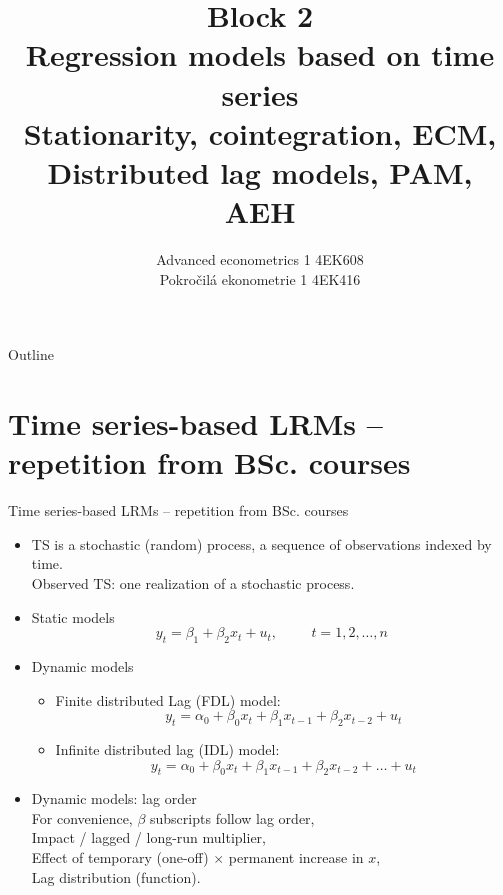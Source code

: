 \documentclass{beamer}
\title[Block 2]{Block 2 \\  Regression models based on time series\\ Stationarity, cointegration, ECM,\\ Distributed lag models, PAM, AEH}
\author{Advanced econometrics 1 4EK608 \\Pokročilá ekonometrie 1 4EK416}
\institute{Vysoká škola ekonomická v Praze}
\date{}
\begin{document}
 \begin{frame}
  \titlepage
\end{frame}
\begin{frame}{Outline}
  \tableofcontents
\end{frame}
\section{Time series-based LRMs -- repetition from BSc. courses}
\small
\begin{frame}{Time series-based LRMs -- repetition from BSc. courses}
\begin{itemize}
  \item TS is a stochastic (random) process, a sequence of observations indexed by time. \\Observed TS: one realization of a stochastic process.
  \medskip
  \item Static models
  $$ y_t = \beta_1 + \beta_2 x_t + u_t , \hspace{1cm} t = 1, 2,  \dots, n $$
  \item Dynamic models
  \begin{itemize}
     \item Finite distributed Lag (FDL) model:
     $$ y_t = \alpha_0 + \beta_0 x_t + \beta_1 x_{t-1} + \beta_2 x_{t-2} + u_t $$
     \item Infinite distributed lag (IDL) model:
     $$ y_t = \alpha_0 + \beta_0 x_t + \beta_1 x_{t-1} + \beta_2 x_{t-2} + \dots + u_t $$
  \end{itemize}
  \item   Dynamic models: lag order\\ For convenience, $\beta$ subscripts follow lag order, \\
  Impact / lagged / long-run multiplier, \\
  Effect of temporary (one-off) $\times$ permanent increase in $x$, \\
  Lag distribution (function).
\end{itemize}
\end{frame}
\end{document}
